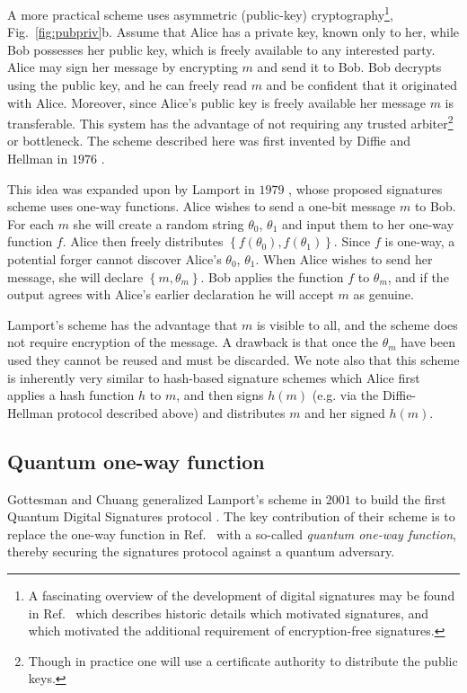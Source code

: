A more practical scheme uses asymmetric (public-key) cryptography\footnote{A fascinating overview of the development of digital signatures may be found in Ref.~\cite{Simmons1988} which describes historic details which motivated signatures, and which motivated the additional requirement of encryption-free signatures.}, Fig.~\ref{fig:pubpriv}b. Assume that Alice has a private key, known only to her, while Bob possesses her public key, which is freely available to any interested party. Alice may sign her message by encrypting $m$ and send it to Bob. Bob decrypts using the public key, and he can freely read $m$ and be confident that it originated with Alice. Moreover, since Alice's public key is freely available her message $m$ is transferable. This system has the advantage of not requiring any trusted arbiter\footnote{Though in practice one will use a certificate authority to distribute the public keys.} or bottleneck. The scheme described here was first invented by Diffie and Hellman in $1976$ \cite{Diffie1976}.

This idea was expanded upon by Lamport in $1979$ \cite{Lamport1979}, whose proposed signatures scheme uses one-way functions. Alice wishes to send a one-bit message $m$ to Bob. For each $m$ she will create a random string $\theta_0$, $\theta_1$ and input them to her one-way function $f$. Alice then freely distributes $\left\{f\left(\theta_0\right), f\left(\theta_1\right)\right\}$. Since $f$ is one-way, a potential forger cannot discover Alice's $\theta_0$, $\theta_1$. When Alice wishes to send her message, she will declare $\left\{m, \theta_m\right\}$. Bob applies the function $f$ to $\theta_m$, and if the output agrees with Alice's earlier declaration he will accept $m$ as genuine. 

Lamport's scheme has the advantage that $m$ is visible to all, and the scheme does not require encryption of the message. A drawback is that once the $\theta_m$ have been used they cannot be reused and must be discarded. We note also that this scheme is inherently very similar to hash-based signature schemes which Alice first applies a hash function $h$ \cite{Schneier1996} to $m$, and then signs $h\left(m\right)$ (e.g. via the Diffie-Hellman protocol described above) and distributes $m$ and her signed $h\left(m\right)$.



\subsection{Quantum one-way function}
Gottesman and Chuang generalized Lamport's scheme in $2001$ to build the first Quantum Digital Signatures protocol \cite{Gottesman2001}. The key contribution of their scheme is to replace the one-way function in Ref.~\cite{Lamport1979} with a so-called \emph{quantum one-way function}, thereby securing the signatures protocol against a quantum adversary.

